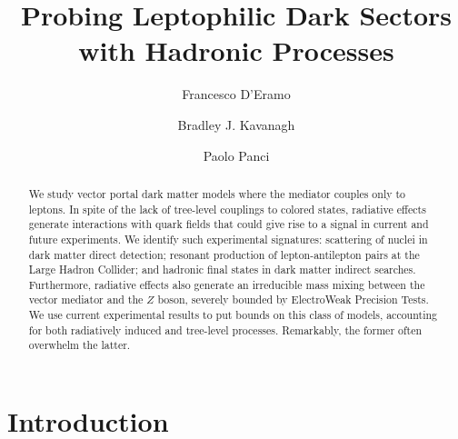 \documentclass[final,5p,twocolumn]{elsarticle}
\begin{document}
\begin{frontmatter}



\title{Probing Leptophilic Dark Sectors with Hadronic Processes}

\author[UCSC,SCIPP]{Francesco D'Eramo}

\author[Jussieu]{Bradley J. Kavanagh}

\author[CERN,IAP]{Paolo Panci}


\address[UCSC]{Department of Physics, University of California Santa Cruz, 1156 High St., Santa Cruz, CA 95064, USA}
\address[SCIPP]{Santa Cruz Institute for Particle Physics, 1156 High St., Santa Cruz, CA 95064, USA}
\address[Jussieu]{Laboratoire de Physique Th\'{e}orique et Hautes Energies, CNRS, UMR 7589, 4 Place Jussieu, F-75252, Paris, France}
\address[CERN]{CERN Theoretical Physics Department, CERN, Case C01600, CH-1211 Gen\`eve, Switzerland}
\address[IAP]{Institut d'Astrophysique de Paris, UMR 7095 CNRS, Universit\'e Pierre et Marie Curie,
98 bis Boulevard Arago, Paris 75014, France}

\begin{abstract}
We study vector portal dark matter models where the mediator couples only to leptons. In spite of the lack of tree-level couplings to colored states, radiative effects generate interactions with quark fields that could give rise to a signal in current and future experiments. We identify such experimental signatures: scattering of nuclei in dark matter direct detection; resonant production of lepton-antilepton pairs at the Large Hadron Collider; and hadronic final states in dark matter indirect searches. Furthermore, radiative effects also generate an irreducible mass mixing between the vector mediator and the $Z$ boson, severely bounded by ElectroWeak Precision Tests. We use current experimental results to put bounds on this class of models, accounting for both radiatively induced and tree-level processes. Remarkably, the former often overwhelm the latter.
\end{abstract}


\end{frontmatter}

\section{Introduction}
\end{document}
